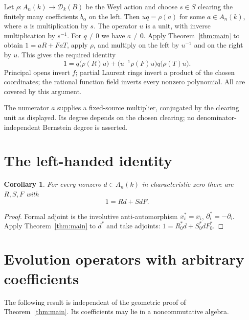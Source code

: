 \documentclass[11pt]{amsart}
\newtheorem{corollary}[theorem]{Corollary}
\theoremstyle{definition}
\begin{document}
Let $\rho:A_n(k)\to\mathcal D_k(B)$ be the Weyl action and choose
$s\in S$ clearing the finitely many coefficients $b_\alpha$ on the left.
Then $u q=\rho(a)$ for some $a\in A_n(k)$, where $u$ is multiplication
by $s$. The operator $u$ is a unit, with inverse multiplication by $s^{-1}$.
For $q\ne0$ we have $a\ne0$. Apply Theorem~\ref{thm:main} to obtain
$1=aR+FaT$, apply $\rho$, and multiply on the left by $u^{-1}$ and on
the right by $u$. This gives the required identity
\[
 1=q\bigl(\rho(R)u\bigr)
   +\bigl(u^{-1}\rho(F)u\bigr)q\bigl(\rho(T)u\bigr).
\]
Principal opens invert $f$; partial Laurent rings invert a product of the
chosen coordinates; the rational function field inverts every nonzero
polynomial. All are covered by this argument.

The numerator $a$ supplies a fixed-source multiplier, conjugated by the
clearing unit as displayed. Its degree depends on the chosen clearing;
no denominator-independent Bernstein degree is asserted.

\section{The left-handed identity}\label{sec:left-handed}

\begin{corollary}\label{cor:left-handed}
For every nonzero $d\in A_n(k)$ in characteristic zero there are $R,S,F$ with
\[
 1=Rd+SdF.
\]
\end{corollary}
\begin{proof}
Formal adjoint is the involutive anti-automorphism
$x_i^*=x_i$, $\partial_i^*=-\partial_i$.
Apply Theorem~\ref{thm:main} to $d^*$ and take adjoints:
$1=R_0^*d+S_0^*dF_0^*$.
\end{proof}

\section{Evolution operators with arbitrary coefficients}\label{sec:evolutionary}

The following result is independent of the geometric proof of
Theorem~\ref{thm:main}. Its coefficients may lie in a noncommutative algebra.
\end{document}
